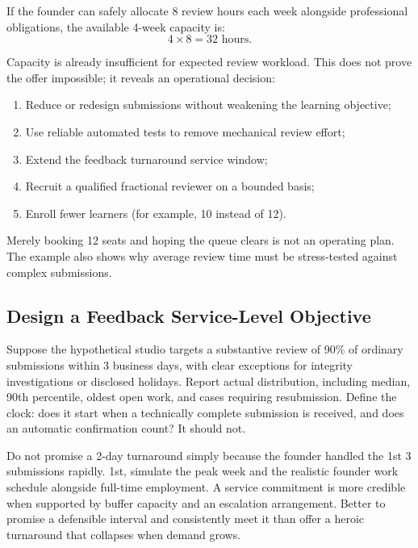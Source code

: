 If the founder can safely allocate 8 review hours each week alongside professional obligations, the available 4-week capacity is:
\begin{equation}
4 \times 8 = 32\text{ hours}.
\end{equation}

Capacity is already insufficient for expected review workload. This does not prove the offer impossible; it reveals an operational decision:
\begin{enumerate}
    \item Reduce or redesign submissions without weakening the learning objective;
    \item Use reliable automated tests to remove mechanical review effort;
    \item Extend the feedback turnaround service window;
    \item Recruit a qualified fractional reviewer on a bounded basis;
    \item Enroll fewer learners (for example, 10 instead of 12).
\end{enumerate}

Merely booking 12 seats and hoping the queue clears is not an operating plan. The example also shows why average review time must be stress-tested against complex submissions.

\subsection{Design a Feedback Service-Level Objective}
\label{sec:bayes_feedback_slo}

Suppose the hypothetical studio targets a substantive review of 90\% of ordinary submissions within 3 business days, with clear exceptions for integrity investigations or disclosed holidays. Report actual distribution, including median, 90th percentile, oldest open work, and cases requiring resubmission. Define the clock: does it start when a technically complete submission is received, and does an automatic confirmation count? It should not.

Do not promise a 2-day turnaround simply because the founder handled the 1st 3 submissions rapidly. 1st, simulate the peak week and the realistic founder work schedule alongside full-time employment. A service commitment is more credible when supported by buffer capacity and an escalation arrangement. Better to promise a defensible interval and consistently meet it than offer a heroic turnaround that collapses when demand grows.

